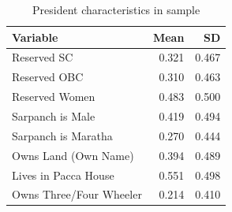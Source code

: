 \begin{table}

\caption{President characteristics in sample}
\centering
\begin{tabular}[t]{lrr}
\toprule
Variable & Mean & SD\\
\midrule
Reserved SC & 0.321 & 0.467\\
Reserved OBC & 0.310 & 0.463\\
Reserved Women & 0.483 & 0.500\\
Sarpanch is Male & 0.419 & 0.494\\
Sarpanch is Maratha & 0.270 & 0.444\\
\addlinespace
Owns Land (Own Name) & 0.394 & 0.489\\
Lives in Pacca House & 0.551 & 0.498\\
Owns Three/Four Wheeler & 0.214 & 0.410\\
\bottomrule
\end{tabular}
\end{table}
